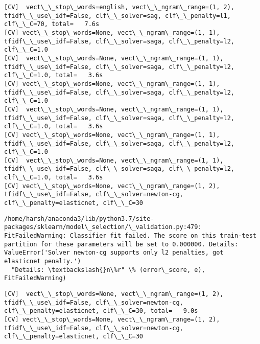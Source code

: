 \documentclass[11pt]{article}
\begin{document}
    \begin{Verbatim}[commandchars=\\\{\}]
[CV]  vect\_\_stop\_words=english, vect\_\_ngram\_range=(1, 2), tfidf\_\_use\_idf=False, clf\_\_solver=sag, clf\_\_penalty=l1, clf\_\_C=70, total=   7.6s
[CV] vect\_\_stop\_words=None, vect\_\_ngram\_range=(1, 1), tfidf\_\_use\_idf=False, clf\_\_solver=saga, clf\_\_penalty=l2, clf\_\_C=1.0 
[CV]  vect\_\_stop\_words=None, vect\_\_ngram\_range=(1, 1), tfidf\_\_use\_idf=False, clf\_\_solver=saga, clf\_\_penalty=l2, clf\_\_C=1.0, total=   3.6s
[CV] vect\_\_stop\_words=None, vect\_\_ngram\_range=(1, 1), tfidf\_\_use\_idf=False, clf\_\_solver=saga, clf\_\_penalty=l2, clf\_\_C=1.0 
[CV]  vect\_\_stop\_words=None, vect\_\_ngram\_range=(1, 1), tfidf\_\_use\_idf=False, clf\_\_solver=saga, clf\_\_penalty=l2, clf\_\_C=1.0, total=   3.6s
[CV] vect\_\_stop\_words=None, vect\_\_ngram\_range=(1, 1), tfidf\_\_use\_idf=False, clf\_\_solver=saga, clf\_\_penalty=l2, clf\_\_C=1.0 
[CV]  vect\_\_stop\_words=None, vect\_\_ngram\_range=(1, 1), tfidf\_\_use\_idf=False, clf\_\_solver=saga, clf\_\_penalty=l2, clf\_\_C=1.0, total=   3.6s
[CV] vect\_\_stop\_words=None, vect\_\_ngram\_range=(1, 2), tfidf\_\_use\_idf=False, clf\_\_solver=newton-cg, clf\_\_penalty=elasticnet, clf\_\_C=30 

    \end{Verbatim}

    \begin{Verbatim}[commandchars=\\\{\}]
/home/harsh/anaconda3/lib/python3.7/site-packages/sklearn/model\_selection/\_validation.py:479: FitFailedWarning: Classifier fit failed. The score on this train-test partition for these parameters will be set to 0.000000. Details: 
ValueError('Solver newton-cg supports only l2 penalties, got elasticnet penalty.')
  "Details: \textbackslash{}n\%r" \% (error\_score, e), FitFailedWarning)

    \end{Verbatim}

    \begin{Verbatim}[commandchars=\\\{\}]
[CV]  vect\_\_stop\_words=None, vect\_\_ngram\_range=(1, 2), tfidf\_\_use\_idf=False, clf\_\_solver=newton-cg, clf\_\_penalty=elasticnet, clf\_\_C=30, total=   9.0s
[CV] vect\_\_stop\_words=None, vect\_\_ngram\_range=(1, 2), tfidf\_\_use\_idf=False, clf\_\_solver=newton-cg, clf\_\_penalty=elasticnet, clf\_\_C=30 

    \end{Verbatim}
\end{document}

